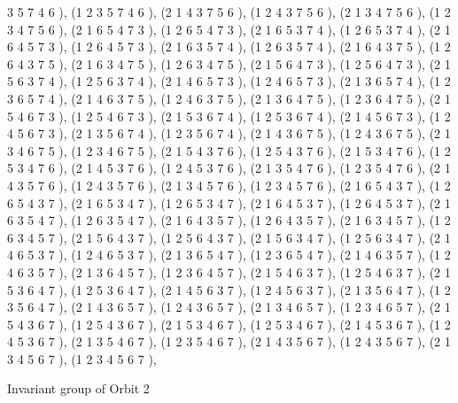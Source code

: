 \documentclass[12pt]{article}
\begin{document}
\begin{enumerate}
3 5 7 4 6  ), (1 2 3 5 7 4 6  ), (2 1 4 3 7 5 6  ), (1 2 4 3 7 5 6  ), (2 1 3 4 7 5 6  ), (1 2 3 4 7 5 6  ), (2 1 6 5 4 7 3  ), (1 2 6 5 4 7 3  ), (2 1 6 5 3 7 4  ), (1 2 6 5 3 7 4  ), (2 1 6 4 5 7 3  ), (1 2 6 4 5 7 3  ), (2 1 6 3 5 7 4  ), (1 2 6 3 5 7 4  ), (2 1 6 4 3 7 5  ), (1 2 6 4 3 7 5  ), (2 1 6 3 4 7 5  ), (1 2 6 3 4 7 5  ), (2 1 5 6 4 7 3  ), (1 2 5 6 4 7 3  ), (2 1 5 6 3 7 4  ), (1 2 5 6 3 7 4  ), (2 1 4 6 5 7 3  ), (1 2 4 6 5 7 3  ), (2 1 3 6 5 7 4  ), (1 2 3 6 5 7 4  ), (2 1 4 6 3 7 5  ), (1 2 4 6 3 7 5  ), (2 1 3 6 4 7 5  ), (1 2 3 6 4 7 5  ), (2 1 5 4 6 7 3  ), (1 2 5 4 6 7 3  ), (2 1 5 3 6 7 4  ), (1 2 5 3 6 7 4  ), (2 1 4 5 6 7 3  ), (1 2 4 5 6 7 3  ), (2 1 3 5 6 7 4  ), (1 2 3 5 6 7 4  ), (2 1 4 3 6 7 5  ), (1 2 4 3 6 7 5  ), (2 1 3 4 6 7 5  ), (1 2 3 4 6 7 5  ), (2 1 5 4 3 7 6  ), (1 2 5 4 3 7 6  ), (2 1 5 3 4 7 6  ), (1 2 5 3 4 7 6  ), (2 1 4 5 3 7 6  ), (1 2 4 5 3 7 6  ), (2 1 3 5 4 7 6  ), (1 2 3 5 4 7 6  ), (2 1 4 3 5 7 6  ), (1 2 4 3 5 7 6  ), (2 1 3 4 5 7 6  ), (1 2 3 4 5 7 6  ), (2 1 6 5 4 3 7  ), (1 2 6 5 4 3 7  ), (2 1 6 5 3 4 7  ), (1 2 6 5 3 4 7  ), (2 1 6 4 5 3 7  ), (1 2 6 4 5 3 7  ), (2 1 6 3 5 4 7  ), (1 2 6 3 5 4 7  ), (2 1 6 4 3 5 7  ), (1 2 6 4 3 5 7  ), (2 1 6 3 4 5 7  ), (1 2 6 3 4 5 7  ), (2 1 5 6 4 3 7  ), (1 2 5 6 4 3 7  ), (2 1 5 6 3 4 7  ), (1 2 5 6 3 4 7  ), (2 1 4 6 5 3 7  ), (1 2 4 6 5 3 7  ), (2 1 3 6 5 4 7  ), (1 2 3 6 5 4 7  ), (2 1 4 6 3 5 7  ), (1 2 4 6 3 5 7  ), (2 1 3 6 4 5 7  ), (1 2 3 6 4 5 7  ), (2 1 5 4 6 3 7  ), (1 2 5 4 6 3 7  ), (2 1 5 3 6 4 7  ), (1 2 5 3 6 4 7  ), (2 1 4 5 6 3 7  ), (1 2 4 5 6 3 7  ), (2 1 3 5 6 4 7  ), (1 2 3 5 6 4 7  ), (2 1 4 3 6 5 7  ), (1 2 4 3 6 5 7  ), (2 1 3 4 6 5 7  ), (1 2 3 4 6 5 7  ), (2 1 5 4 3 6 7  ), (1 2 5 4 3 6 7  ), (2 1 5 3 4 6 7  ), (1 2 5 3 4 6 7  ), (2 1 4 5 3 6 7  ), (1 2 4 5 3 6 7  ), (2 1 3 5 4 6 7  ), (1 2 3 5 4 6 7  ), (2 1 4 3 5 6 7  ), (1 2 4 3 5 6 7  ), (2 1 3 4 5 6 7  ), (1 2 3 4 5 6 7  ), 
\end{enumerate}
Invariant group of Orbit 2
\end{document}
